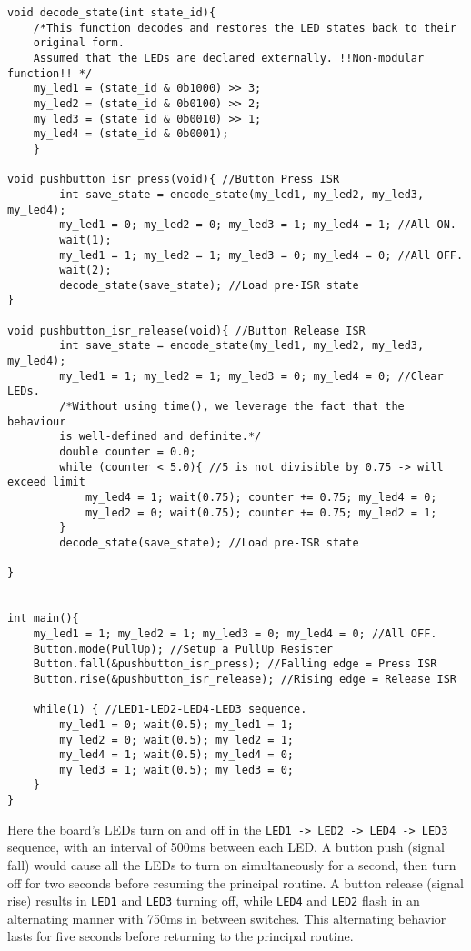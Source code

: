 \documentclass{article}
\begin{document}
\begin{verbatim}
void decode_state(int state_id){
    /*This function decodes and restores the LED states back to their
    original form.
    Assumed that the LEDs are declared externally. !!Non-modular function!! */
    my_led1 = (state_id & 0b1000) >> 3;
    my_led2 = (state_id & 0b0100) >> 2;
    my_led3 = (state_id & 0b0010) >> 1;
    my_led4 = (state_id & 0b0001);
    }

void pushbutton_isr_press(void){ //Button Press ISR
        int save_state = encode_state(my_led1, my_led2, my_led3, my_led4);
        my_led1 = 0; my_led2 = 0; my_led3 = 1; my_led4 = 1; //All ON.
        wait(1);
        my_led1 = 1; my_led2 = 1; my_led3 = 0; my_led4 = 0; //All OFF.
        wait(2);
        decode_state(save_state); //Load pre-ISR state
}

void pushbutton_isr_release(void){ //Button Release ISR
        int save_state = encode_state(my_led1, my_led2, my_led3, my_led4);
        my_led1 = 1; my_led2 = 1; my_led3 = 0; my_led4 = 0; //Clear LEDs.
        /*Without using time(), we leverage the fact that the behaviour
        is well-defined and definite.*/
        double counter = 0.0;
        while (counter < 5.0){ //5 is not divisible by 0.75 -> will exceed limit
            my_led4 = 1; wait(0.75); counter += 0.75; my_led4 = 0;
            my_led2 = 0; wait(0.75); counter += 0.75; my_led2 = 1;
        }
        decode_state(save_state); //Load pre-ISR state
       
}


int main(){
    my_led1 = 1; my_led2 = 1; my_led3 = 0; my_led4 = 0; //All OFF.
    Button.mode(PullUp); //Setup a PullUp Resister
    Button.fall(&pushbutton_isr_press); //Falling edge = Press ISR
    Button.rise(&pushbutton_isr_release); //Rising edge = Release ISR
    
    while(1) { //LED1-LED2-LED4-LED3 sequence.
        my_led1 = 0; wait(0.5); my_led1 = 1;
        my_led2 = 0; wait(0.5); my_led2 = 1;
        my_led4 = 1; wait(0.5); my_led4 = 0;
        my_led3 = 1; wait(0.5); my_led3 = 0;    
    }
}
\end{verbatim}


Here the board's LEDs turn on and off in the \texttt{LED1 -> LED2 -> LED4 -> LED3} sequence, with an interval of 500ms between each LED. A button push (signal fall) would cause all the LEDs to turn on simultaneously for a second, then turn off for two seconds before resuming the principal routine. A button release (signal rise) results in \texttt{LED1} and \texttt{LED3} turning off, while \texttt{LED4} and \texttt{LED2} flash in an alternating manner with 750ms in between switches. This alternating behavior lasts for five seconds before returning to the principal routine.
\end{document}
